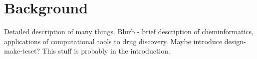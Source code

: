 \chapter{Background} \label{ch:background}

Detailed description of many things. Blurb - brief description of cheminformatics, applications of computational tools to drug discovery. Maybe introduce design-make-teset? This stuff is probably in the introduction.



